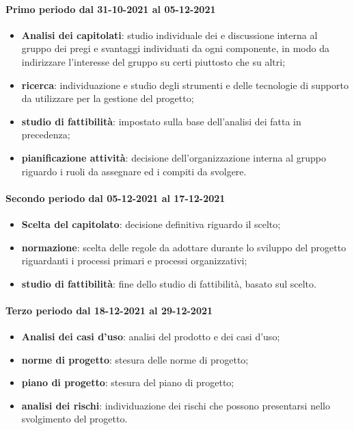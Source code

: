 	\paragraph{Primo periodo dal 31-10-2021 al 05-12-2021}
	\begin{itemize}
	\item \textbf{Analisi dei capitolati}: studio individuale dei  e discussione interna al gruppo dei pregi e svantaggi individuati da ogni componente, in modo da indirizzare l’interesse del gruppo su certi  piuttosto che su altri;
	\item \textbf{ricerca}: individuazione e studio degli strumenti e delle tecnologie di supporto da utilizzare per
	la gestione del progetto;
	\item \textbf{studio di fattibilità}: impostato sulla base dell'analisi dei  fatta in precedenza;
	\item \textbf{pianificazione attività}: decisione dell'organizzazione interna al gruppo riguardo i ruoli
	da assegnare ed i compiti da svolgere.
	\end{itemize}
	
	\paragraph{Secondo periodo dal 05-12-2021 al 17-12-2021}
	\begin{itemize}
	\item \textbf{Scelta del capitolato}: decisione definitiva riguardo il  scelto;
	\item \textbf{normazione}: scelta delle regole da adottare durante lo sviluppo del progetto riguardanti i
	processi primari e processi organizzativi;
	\item \textbf{studio di fattibilità}: fine dello studio di fattibilità, basato sul  scelto.
	\end{itemize}
	
	\paragraph{Terzo periodo dal 18-12-2021 al 29-12-2021}
	\begin{itemize}
		\item \textbf{Analisi dei casi d'uso}: analisi del prodotto e dei casi d’uso;
		\item \textbf{norme di progetto}: stesura delle norme di progetto;
		\item \textbf{piano di progetto}: stesura del piano di progetto;
		\item \textbf{analisi dei rischi}: individuazione dei rischi che possono presentarsi nello svolgimento del progetto.
	\end{itemize}
	
